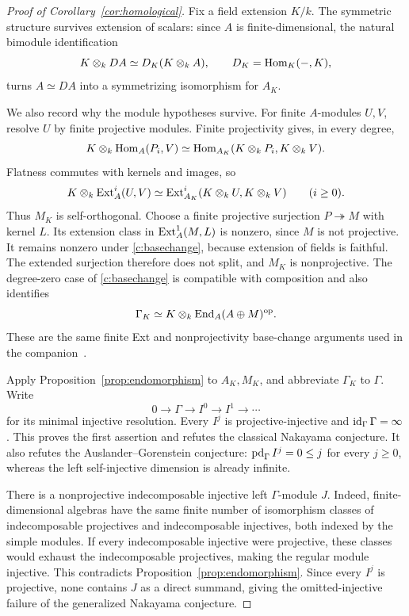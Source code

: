 \begin{proof}[Proof of Corollary~\ref{cor:homological}]
Fix a field extension $K/k$. The symmetric structure survives
extension of scalars: since $A$ is finite-dimensional, the natural
bimodule identification
\[
 K\otimes_k DA\simeq D_K(K\otimes_k A),
 \qquad D_K=\operatorname{Hom}_K(-,K),
\]
turns $A\simeq DA$ into a symmetrizing isomorphism for $A_K$.

We also record why the module hypotheses survive. For finite
$A$-modules $U,V$, resolve $U$ by finite projective modules.
Finite projectivity gives, in every degree,
\[
 K\otimes_k\operatorname{Hom}_A(P_i,V)
 \simeq
 \operatorname{Hom}_{A_K}(K\otimes_kP_i,K\otimes_kV).
\]
Flatness commutes with kernels and images, so
\begin{equation}\label{c:basechange}
 K\otimes_k\operatorname{Ext}_A^i(U,V)
 \simeq \operatorname{Ext}_{A_K}^i(K\otimes_kU,K\otimes_kV)
 \qquad(i\geq0).
\end{equation}
Thus $M_K$ is self-orthogonal. Choose a finite projective surjection
$P\twoheadrightarrow M$ with kernel $L$. Its extension class in
$\operatorname{Ext}_A^1(M,L)$ is nonzero, since $M$ is not projective.
It remains nonzero under \eqref{c:basechange}, because extension of
fields is faithful. The extended surjection therefore does not split,
and $M_K$ is nonprojective. The degree-zero case of
\eqref{c:basechange} is compatible with composition and also identifies
\[
 \Gamma_K\simeq K\otimes_k\operatorname{End}_A(A\oplus M)^{\mathrm{op}}.
\]
These are the same finite Ext and nonprojectivity base-change
arguments used in the companion~\cite[Proposition~9.2]{OpenAIAR2026}.

Apply Proposition~\ref{prop:endomorphism} to $A_K,M_K$, and abbreviate
$\Gamma_K$ to $\Gamma$. Write
\[
 0\longrightarrow\Gamma\longrightarrow I^0
 \longrightarrow I^1\longrightarrow\cdots
\]
for its minimal injective resolution. Every $I^j$ is
projective-injective and $\operatorname{id}_\Gamma\Gamma=\infty$.
This proves the first assertion and refutes the classical Nakayama
conjecture. It also refutes the Auslander--Gorenstein conjecture:
$\operatorname{pd}_\Gamma I^j=0\leq j$ for every $j\geq0$, whereas the left
self-injective dimension is already infinite.

There is a nonprojective indecomposable injective left $\Gamma$-module
$J$. Indeed, finite-dimensional algebras have the same finite number
of isomorphism classes of indecomposable projectives and indecomposable
injectives, both indexed by the simple modules. If every indecomposable
injective were projective, these classes would exhaust the indecomposable
projectives, making the regular module injective. This contradicts
Proposition~\ref{prop:endomorphism}. Since every $I^j$ is projective,
none contains $J$ as a direct summand, giving the omitted-injective
failure of the generalized Nakayama conjecture.


\end{proof}
